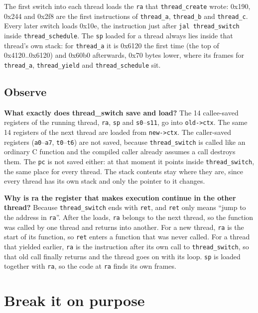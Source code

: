 \documentclass{assets/utmreport}
\begin{document}
The first switch into each thread loads the \texttt{ra} that \texttt{thread\_create} wrote: 0x190, 0x244 and 0x2f8 are the first instructions of \texttt{thread\_a}, \texttt{thread\_b} and \texttt{thread\_c}. Every later switch loads 0x10e, the instruction just after \texttt{jal thread\_switch} inside \texttt{thread\_schedule}. The \texttt{sp} loaded for a thread always lies inside that thread's own stack: for \texttt{thread\_a} it is 0x6120 the first time (the top of 0x4120..0x6120) and 0x60b0 afterwards, 0x70 bytes lower, where its frames for \texttt{thread\_a}, \texttt{thread\_yield} and \texttt{thread\_schedule} sit.

\section*{Observe}
\textbf{What exactly does thread\_switch save and load?}
The 14 callee-saved registers of the running thread, \texttt{ra}, \texttt{sp} and \texttt{s0}--\texttt{s11}, go into \texttt{old->ctx}. The same 14 registers of the next thread are loaded from \texttt{new->ctx}. The caller-saved registers (\texttt{a0}--\texttt{a7}, \texttt{t0}--\texttt{t6}) are not saved, because \texttt{thread\_switch} is called like an ordinary C function and the compiled caller already assumes a call destroys them. The \texttt{pc} is not saved either: at that moment it points inside \texttt{thread\_switch}, the same place for every thread. The stack contents stay where they are, since every thread has its own stack and only the pointer to it changes.

\textbf{Why is ra the register that makes execution continue in the other thread?}
Because \texttt{thread\_switch} ends with \texttt{ret}, and \texttt{ret} only means ``jump to the address in \texttt{ra}''. After the loads, \texttt{ra} belongs to the next thread, so the function was called by one thread and returns into another. For a new thread, \texttt{ra} is the start of its function, so \texttt{ret} enters a function that was never called. For a thread that yielded earlier, \texttt{ra} is the instruction after its own call to \texttt{thread\_switch}, so that old call finally returns and the thread goes on with its loop. \texttt{sp} is loaded together with \texttt{ra}, so the code at \texttt{ra} finds its own frames.

\chapter{Break it on purpose}
\end{document}
